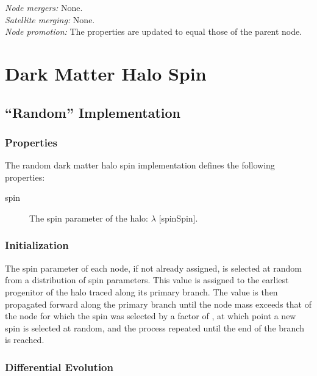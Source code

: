 \noindent\emph{Node mergers:} None.\\

\noindent\emph{Satellite merging:} None.\\

\noindent\emph{Node promotion:} The properties are updated to equal those of the parent node.\\

\section{Dark Matter Halo Spin}\label{sec:DarkMatterHaloSpinComponent}

\subsection{``Random'' Implementation}

\subsubsection{Properties}

The random dark matter halo spin implementation defines the following properties:
\begin{description}
 \item [{\normalfont \ttfamily spin}] The spin parameter of the halo: $\lambda$ [{\normalfont \ttfamily spinSpin}].
\end{description}

\subsubsection{Initialization}

The spin parameter of each node, if not already assigned, is selected at random from a distribution of spin parameters. This value is assigned to the earliest progenitor of the halo traced along its primary branch. The value is then propagated forward along the primary branch until the \gls{node} mass exceeds that of the \gls{node} for which the spin was selected by a factor of {\normalfont \ttfamily [randomSpinResetMassFactor]}, at which point a new spin is selected at random, and the process repeated until the end of the branch is reached. 

\subsubsection{Differential Evolution}

